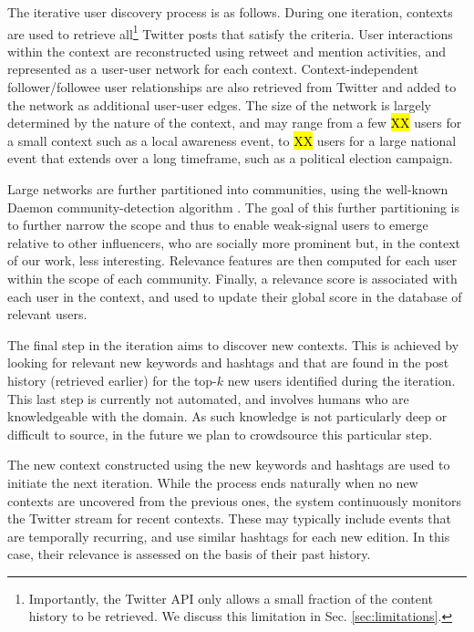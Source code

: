 \documentclass[runningheads]{llncs}
\begin{document}
The iterative user discovery process is as follows.
During one iteration, contexts are used to retrieve all\footnote{Importantly, the Twitter API only allows a small fraction of the content history to be retrieved. We discuss this limitation in Sec. \ref{sec:limitations}.}
	 Twitter posts that satisfy the criteria.
User interactions within the context are reconstructed using retweet and mention activities, and represented as a user-user network for each context. 
%
Context-independent follower/followee user relationships are also retrieved from Twitter and added to the network as additional user-user edges.
The size of the network is largely determined by the nature of the context, and may range from a few \hl{XX} users for a small context such as a local awareness event, to \hl{XX} users for a large national event that extends over a long timeframe, such as a political election campaign.

Large networks are further partitioned into communities, using the well-known Daemon community-detection algorithm \cite{DEMON}.
%
The goal of this further partitioning is to further narrow the scope and thus to enable weak-signal users to emerge relative to other influencers, who are socially more prominent but, in the context of our work, less interesting.
Relevance features are then computed for each user within the scope of each community. 
Finally, a relevance score is associated with each user in the context, and used to update their global score in the database of relevant users.

The final step in the iteration aims to discover new contexts. 
This is achieved by looking for relevant new keywords and hashtags and that are found in the post history (retrieved earlier) for the top-$k$ new users identified during the iteration. 
This last step is currently not automated, and involves humans who are knowledgeable with the domain. 
As such knowledge is not particularly deep or difficult to source, in the future we plan to crowdsource this particular step.

The new context constructed using the new keywords and hashtags are used to initiate the next iteration. 
While the process ends naturally when no new contexts are uncovered from the previous ones, the system continuously monitors the Twitter stream for recent contexts. These may typically include events that are temporally recurring, and use similar hashtags for each new edition. In this case, their relevance is assessed on the basis of their past history.
\end{document}

